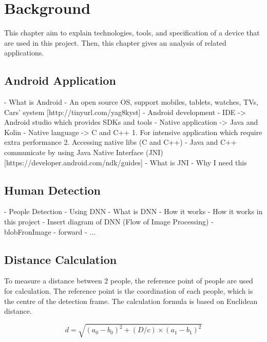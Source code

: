 \chapter{Background}\label{background}

    This chapter aim to explain technologies, tools, and specification of a device that are used in this project.
    Then, this chapter gives an analysis of related applications.

    \section{Android Application}
        -	What is Android
            - An open source OS, support mobiles, tablets, watches, TVs, Cars’ system [http://tinyurl.com/yag8kyst]
        -	Android development
            - IDE -> Android studio which provides SDKs and tools
            - Native application -> Java and Kolin
            - Native language -> C and C++
                1.	For intensive application which require extra performance
                2.	Accessing native libs (C and C++)
            - Java and C++ communicate by using Java Native Interface (JNI) [https://developer.android.com/ndk/guides]
                - What is JNI
                - Why I need this


    \section{Human Detection}
        -	People Detection
            - Using DNN
            - What is DNN
            - How it works
            - How it works in this project
                - Insert diagram of DNN (Flow of Image Processing)
                    - blobFronImage
                    - forward
                    - ...

    \section{Distance Calculation}
        To measure a distance between 2 people, the reference point of people are used for calculation.
        The reference point is the coordination of each people, which is the centre of the detection frame.
        The calculation formula is based on Euclidean distance.

        \begin{equation*}
            d = \sqrt{(a_{0}-b_{0})^{2}+(D/c)\times(a_{1}-b_{1})^{2}}
        \end{equation*}

